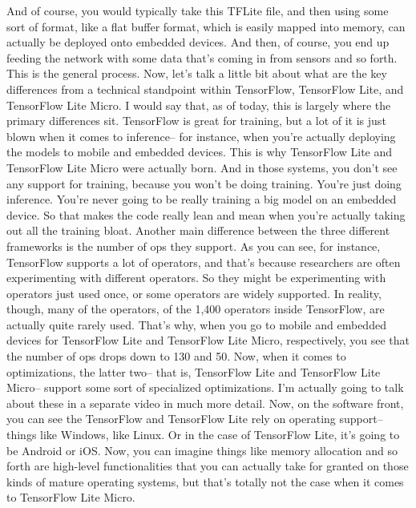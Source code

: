 {{{{{    And of course, you would typically take this TFLite file,
    and then using some sort of format, like a flat buffer format, which
    is easily mapped into memory, can actually
    be deployed onto embedded devices.
    And then, of course, you end up feeding the network with some data that's
    coming in from sensors and so forth.
    This is the general process.
    Now, let's talk a little bit about what are
    the key differences from a technical standpoint within TensorFlow,
    TensorFlow Lite, and TensorFlow Lite Micro.
    I would say that, as of today, this is largely
    where the primary differences sit.
    TensorFlow is great for training, but a lot of it
    is just blown when it comes to inference-- for instance,
    when you're actually deploying the models to mobile and embedded devices.
    This is why TensorFlow Lite and TensorFlow Lite Micro
    were actually born.
    And in those systems, you don't see any support for training,
    because you won't be doing training.
    You're just doing inference.
    You're never going to be really training a big model on an embedded device.
    So that makes the code really lean and mean when you're actually
    taking out all the training bloat.
    Another main difference between the three different frameworks
    is the number of ops they support.
    As you can see, for instance, TensorFlow supports a lot of operators,
    and that's because researchers are often experimenting with different operators.
    So they might be experimenting with operators just used once,
    or some operators are widely supported.
    In reality, though, many of the operators,
    of the 1,400 operators inside TensorFlow,
    are actually quite rarely used.
    That's why, when you go to mobile and embedded devices
    for TensorFlow Lite and TensorFlow Lite Micro, respectively,
    you see that the number of ops drops down to 130 and 50.
    Now, when it comes to optimizations, the latter two-- that is,
    TensorFlow Lite and TensorFlow Lite Micro--
    support some sort of specialized optimizations.
    I'm actually going to talk about these in a separate video in much
    more detail.
    Now, on the software front, you can see the TensorFlow and TensorFlow
    Lite rely on operating support--
    things like Windows, like Linux.
    Or in the case of TensorFlow Lite, it's going to be Android or iOS.
    Now, you can imagine things like memory allocation
    and so forth are high-level functionalities
    that you can actually take for granted on those kinds of mature operating
    systems, but that's totally not the case when it comes to TensorFlow Lite Micro.
}}}}}
